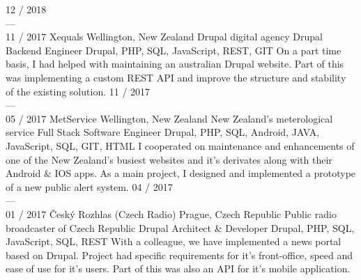 \documentclass[]{friggeri-cv} %
\begin{document}
\begin{entrylist}
{{            }%
        }
    \end{entrylist}

    \begin{entrylist}
        \job
        {12 / 2018 \\ --- \\ 11 / 2017}
        {Xequals}
        {Wellington, New Zealand}
        {Drupal digital agency}
        {
            \position
            {Drupal Backend Engineer}
            {Drupal, PHP, SQL, JavaScript, REST, GIT}
            {
                On a part time basis, I had helped with maintaining an australian Drupal website. Part of this
            was implementing a custom REST API and improve the structure and stability of the existing solution.
            }
        }
        \job
        {11 / 2017 \\ --- \\ 05 / 2017}
        {MetService}
        {Wellington, New Zealand}
        {New Zealand's meterological service}
        {
            \position
            {Full Stack Software Engineer}
            {Drupal, PHP, SQL, Android, JAVA, JavaScript, SQL, GIT, HTML}
            {
                I cooperated on maintenance and enhancements of one of the New Zealand's busiest websites and it's derivates along with their Android \& IOS apps.
                As a main project, I designed and implemented a prototype of a new public alert system.
            }
        }
        \job
        {04 / 2017 \\ --- \\ 01 / 2017}
        {Český Rozhlas (Czech Radio)}
        {Prague, Czech Republic}
        {Public radio broadcaster of Czech Republic}
        {
            \position
            {Drupal Architect \& Developer}
            {Drupal, PHP, SQL, JavaScript, SQL, REST}
            {
                With a colleague, we have implemented a news portal based on Drupal. Project had specific requirements for
            it's front-office, speed and ease of use for it's users. Part of this was also an API for it's mobile application.
            }%
        }


\end{entrylist}
\end{document}
